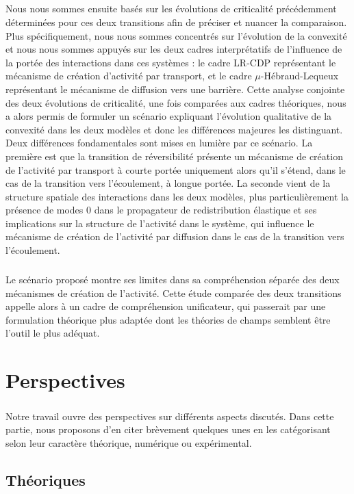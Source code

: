 \subparagraph{}Nous nous sommes ensuite basés sur les évolutions de criticalité précédemment déterminées pour ces deux transitions afin de préciser et nuancer la comparaison. Plus spécifiquement, nous nous sommes concentrés sur l'évolution de la convexité et nous nous sommes appuyés sur les deux cadres interprétatifs de l'influence de la portée des interactions dans ces systèmes : le cadre LR-CDP représentant le mécanisme de création d'activité par transport, et le cadre $\mu$-Hébraud-Lequeux représentant le mécanisme de diffusion vers une barrière. Cette analyse conjointe des deux évolutions de criticalité, une fois comparées aux cadres théoriques, nous a alors permis de formuler un scénario expliquant l'évolution qualitative de la convexité dans les deux modèles et donc les différences majeures les distinguant. Deux différences fondamentales sont mises en lumière par ce scénario. La première est que la transition de réversibilité présente un mécanisme de création de l'activité par transport à courte portée uniquement alors qu'il s'étend, dans le cas de la transition vers l'écoulement, à longue portée. La seconde vient de la structure spatiale des interactions dans les deux modèles, plus particulièrement la présence de modes 0 dans le propagateur de redistribution élastique et ses implications sur la structure de l'activité dans le système, qui influence le mécanisme de création de l'activité par diffusion dans le cas de la transition vers l'écoulement.

\subparagraph{}Le scénario proposé montre ses limites dans sa compréhension séparée des deux mécanismes de création de l'activité. Cette étude comparée des deux transitions appelle alors à un cadre de compréhension unificateur, qui passerait par une formulation théorique plus adaptée dont les théories de champs semblent être l'outil le plus adéquat.

\section*{Perspectives}

\subparagraph{}Notre travail ouvre des perspectives sur différents aspects discutés. Dans cette partie, nous proposons d'en citer brèvement quelques unes en les catégorisant selon leur caractère théorique, numérique ou expérimental.

\subsection*{Théoriques}

